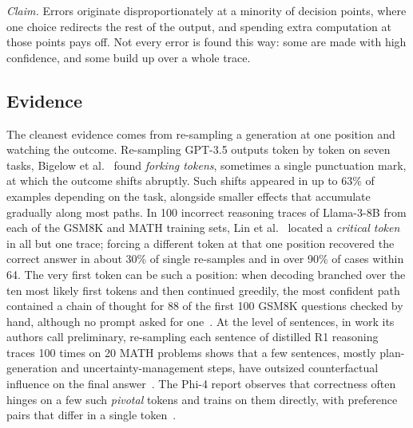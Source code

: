 \documentclass{ieeeaccess}
\begin{document}
\emph{Claim.} Errors originate disproportionately at a minority of decision points, where one choice redirects the rest of the output, and spending extra computation at those points pays off. Not every error is found this way: some are made with high confidence, and some build up over a whole trace.

\subsection{Evidence}
The cleanest evidence comes from re-sampling a generation at one position and watching the outcome. Re-sampling GPT-3.5 outputs token by token on seven tasks, Bigelow et al.~\cite{bigelow2025forking} found \emph{forking tokens}, sometimes a single punctuation mark, at which the outcome shifts abruptly. Such shifts appeared in up to 63\% of examples depending on the task, alongside smaller effects that accumulate gradually along most paths. In 100 incorrect reasoning traces of Llama-3-8B from each of the GSM8K and MATH training sets, Lin et al.~\cite{lin2024critical} located a \emph{critical token} in all but one trace; forcing a different token at that one position recovered the correct answer in about 30\% of single re-samples and in over 90\% of cases within 64. The very first token can be such a position: when decoding branched over the ten most likely first tokens and then continued greedily, the most confident path contained a chain of thought for 88 of the first 100 GSM8K questions checked by hand, although no prompt asked for one~\cite{wang2024chain}. At the level of sentences, in work its authors call preliminary, re-sampling each sentence of distilled R1 reasoning traces 100 times on 20 MATH problems shows that a few sentences, mostly plan-generation and uncertainty-management steps, have outsized counterfactual influence on the final answer~\cite{bogdan2025anchors}. The Phi-4 report observes that correctness often hinges on a few such \emph{pivotal} tokens and trains on them directly, with preference pairs that differ in a single token~\cite{abdin2024phi4}.
\end{document}
